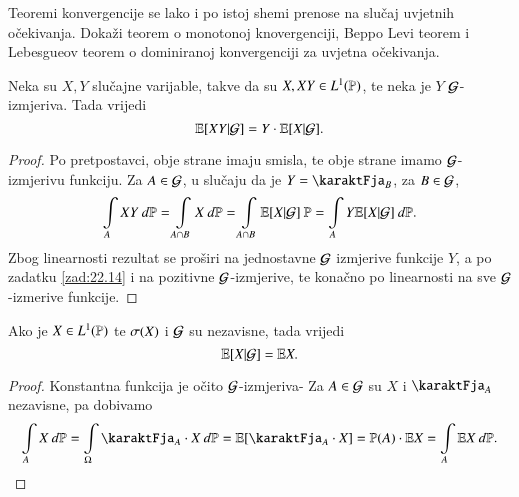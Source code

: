 \begin{zad} \label{zad:22.14}
    Teoremi konvergencije se lako i po istoj shemi prenose na slu\v caj uvjetnih o\v cekivanja.
    Doka\v zi teorem o monotonoj knovergenciji, Beppo Levi teorem i Lebesgueov teorem o dominiranoj konvergenciji za uvjetna o\v cekivanja.
\end{zad}

\begin{prop}    \label{prop:22.15}
    Neka su $X, Y$ slu\v cajne varijable, takve da su $X, X Y \in L^1 (\mathbb{P})$, te neka je $Y$ $\mathcal{G}$-izmjeriva.
    Tada vrijedi
    \begin{equation*}
        \mathbb{E} [X Y | \mathcal{G}] = Y \cdot \mathbb{E} [X | \mathcal{G}].
    \end{equation*} 
\end{prop}

\begin{proof}
    Po pretpostavci, obje strane imaju smisla, te obje strane imamo $\mathcal{G}$-izmjerivu funkciju.
    Za $A \in \mathcal{G}$, u slu\v caju da je $Y = \karaktFja_B$, za $B \in \mathcal{G}$,
    \begin{equation*}
        \int\limits_A X Y \: d \mathbb{P} = \int\limits_{A \cap B} X \: d \mathbb{P} = \int\limits_{A \cap B} \mathbb{E} [X | \mathcal{G}] \: \mathbb{P} = \int\limits_A Y \mathbb{E}[X | \mathcal{G}] \: d \mathbb{P}.
    \end{equation*}
    Zbog linearnosti rezultat se pro\v siri na jednostavne $\mathcal{G}$ izmjerive funkcije $Y$, a po zadatku \ref{zad:22.14} i na pozitivne $\mathcal{G}$-izmjerive, te kona\v cno po linearnosti na sve $\mathcal{G}$-izmerive funkcije. 
\end{proof}

\begin{prop}    \label{prop:22.16}
    Ako je $X \in L^1 (\mathbb{P})$ te $\sigma({X})$ i $\mathcal{G}$ su nezavisne, tada vrijedi
    \begin{equation*}
        \mathbb{E} [X | \mathcal{G}] = \mathbb{E} X.
    \end{equation*}
\end{prop}

\begin{proof}
    Konstantna funkcija je o\v cito $\mathcal{G}$-izmjeriva-
    Za $A \in \mathcal{G}$ su $X$ i $\karaktFja_A$ nezavisne, pa dobivamo
    \begin{equation*}
        \int\limits_A X \: d \masP = \int\limits_\Omega \karaktFja_A \cdot X \: d \masP = \masE [\karaktFja_A \cdot X] = \masP(A) \cdot \masE X = \int\limits_A \masE X \: d \masP.
    \end{equation*}
\end{proof}

